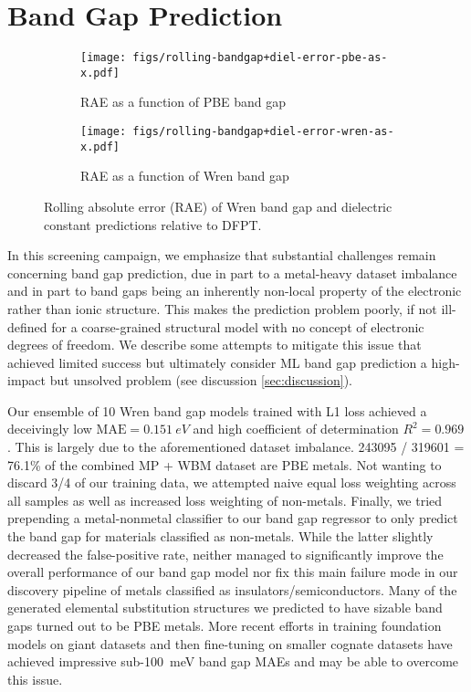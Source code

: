 \documentclass{article}
\begin{document}
\clearpage
\section{Band Gap Prediction}
\label{sec:band-gap-model}

\begin{figure}[ht!]
    \centering
    \begin{subfigure}[b]{0.495\linewidth}
        \texttt{[image: figs/rolling-bandgap+diel-error-pbe-as-x.pdf]}
        \caption{RAE as a function of PBE band gap}
        \label{fig:rolling-bandgap-diel-error-pbe-as-x}
    \end{subfigure}
    \hfil
    \begin{subfigure}[b]{0.495\linewidth}
        \texttt{[image: figs/rolling-bandgap+diel-error-wren-as-x.pdf]}
        \caption{RAE as a function of Wren band gap}
        \label{fig:rolling-bandgap-diel-error-wren-as-x}
    \end{subfigure}
    \caption{
        Rolling absolute error (RAE) of Wren band gap and dielectric constant predictions relative to DFPT.
    }
    \label{fig:rolling-bandgap-diel-error}
\end{figure}

In this screening campaign, we emphasize that substantial challenges remain concerning band gap prediction, due in part to a metal-heavy dataset imbalance and in part to band gaps being an inherently non-local property of the electronic rather than ionic structure.
This makes the prediction problem poorly, if not ill-defined for a coarse-grained structural model with no concept of electronic degrees of freedom.
We describe some attempts to mitigate this issue that achieved limited success but ultimately consider ML band gap prediction a high-impact but unsolved problem (see discussion \cref{sec:discussion}).

Our ensemble of 10 Wren band gap models trained with L1 loss achieved a deceivingly low $\text{MAE} = \SI{0.151}{eV}$ and high coefficient of determination $R^2 = 0.969$.
This is largely due to the aforementioned dataset imbalance.
\num{243095} / \num{319601} = 76.1\% of the combined MP + WBM dataset are PBE metals.
Not wanting to discard 3/4 of our training data, we attempted naive equal loss weighting across all samples as well as increased loss weighting of non-metals.
Finally, we tried prepending a metal-nonmetal classifier to our band gap regressor to only predict the band gap for materials classified as non-metals.
While the latter slightly decreased the false-positive rate, neither managed to significantly improve the overall performance of our band gap model nor fix this main failure mode in our discovery pipeline of metals classified as insulators/semiconductors.
Many of the generated elemental substitution structures we predicted to have sizable band gaps turned out to be PBE metals.
More recent efforts in training foundation models on giant datasets and then fine-tuning on smaller cognate datasets \cite{shoghi_molecules_2023} have achieved impressive sub-\SI{100}{meV} band gap MAEs and may be able to overcome this issue.
\end{document}
